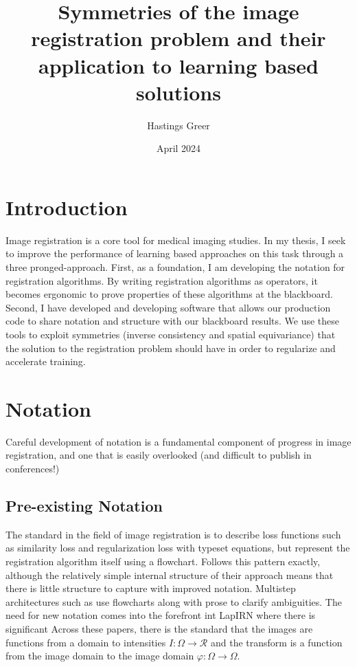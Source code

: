 \documentclass{article}
\title{Symmetries of the image registration problem and their application to learning based solutions}
\author{Hastings Greer }
\date{April 2024}
\begin{document}
\maketitle

\section{Introduction}

Image registration is a core tool for medical imaging studies. In my thesis, I
seek to improve the performance of learning based approaches on this task
through a three pronged-approach. First, as a foundation, I am developing the
notation for registration algorithms. By writing registration algorithms as
operators, it becomes ergonomic to prove properties of these algorithms at the
blackboard. Second, I have developed and developing software that allows our
production code to share notation and structure with our blackboard results. We
use these tools to exploit symmetries (inverse consistency and spatial
equivariance) that the solution to the registration problem should have in
order to regularize and accelerate training.

\section{Notation}

Careful development of notation is a fundamental component of progress in image
registration, and one that is easily overlooked (and difficult to publish in
conferences!)

\subsection{Pre-existing Notation}
The standard in the field of image registration is to describe loss functions
such as similarity loss and regularization loss with typeset equations, but
represent the registration algorithm itself using a flowchart.
\cite{balakrishnan2019voxelmorph} Follows this pattern exactly, although the
relatively simple internal structure of their approach means that there is
little structure to capture with improved notation. Multistep architectures
such as \cite{shen2019networks, mok2020large} use flowcharts along with prose
to clarify ambiguities. The need for new notation comes into the forefront int
LapIRN \cite{mok2020large} where there is significant Across these papers,
there is the standard that the images are functions from a domain to
intensities $I: \Omega \rightarrow \mathcal{R}$ and the transform is a function
from the image domain to the image domain $\varphi: \Omega \rightarrow \Omega$.
\end{document}
